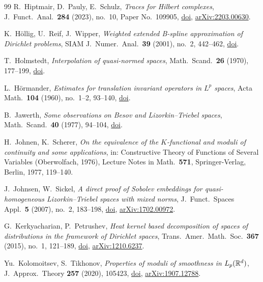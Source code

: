 \begin{thebibliography}{99}
R.~Hiptmair, D.~Pauly, E.~Schulz,
\emph{Traces for Hilbert complexes},
J.\ Funct.\ Anal.\ \textbf{284} (2023), no.~10, Paper No.~109905,
\href{https://doi.org/10.1016/j.jfa.2023.109905}{doi},
\href{https://arxiv.org/abs/2203.00630}{arXiv:2203.00630}.

K.~H\"ollig, U.~Reif, J.~Wipper,
\emph{Weighted extended B-spline approximation of Dirichlet problems},
SIAM J.\ Numer.\ Anal.\ \textbf{39} (2001), no.~2, 442--462,
\href{https://doi.org/10.1137/S0036142900373208}{doi}.

T.~Holmstedt,
\emph{Interpolation of quasi-normed spaces},
Math.\ Scand.\ \textbf{26} (1970), 177--199,
\href{https://doi.org/10.7146/math.scand.a-10976}{doi}.

L.~H\"ormander,
\emph{Estimates for translation invariant operators in $L^p$ spaces},
Acta Math.\ \textbf{104} (1960), no.~1--2, 93--140,
\href{https://doi.org/10.1007/BF02547187}{doi}.

B.~Jawerth,
\emph{Some observations on Besov and Lizorkin--Triebel spaces},
Math.\ Scand.\ \textbf{40} (1977), 94--104,
\href{https://doi.org/10.7146/math.scand.a-11678}{doi}.

H.~Johnen, K.~Scherer,
\emph{On the equivalence of the $K$-functional and moduli of continuity and some applications},
in: Constructive Theory of Functions of Several Variables (Oberwolfach, 1976), Lecture Notes in
Math.\ \textbf{571}, Springer-Verlag, Berlin, 1977, 119--140.

J.~Johnsen, W.~Sickel,
\emph{A direct proof of Sobolev embeddings for quasi-homogeneous Lizorkin--Triebel spaces with
mixed norms},
J.\ Funct.\ Spaces Appl.\ \textbf{5} (2007), no.~2, 183--198,
\href{https://doi.org/10.1155/2007/714905}{doi},
\href{https://arxiv.org/abs/1702.00972}{arXiv:1702.00972}.

G.~Kerkyacharian, P.~Petrushev,
\emph{Heat kernel based decomposition of spaces of distributions in the framework of Dirichlet
spaces},
Trans.\ Amer.\ Math.\ Soc.\ \textbf{367} (2015), no.~1, 121--189,
\href{https://doi.org/10.1090/S0002-9947-2014-05993-X}{doi},
\href{https://arxiv.org/abs/1210.6237}{arXiv:1210.6237}.

Yu.~Kolomoitsev, S.~Tikhonov,
\emph{Properties of moduli of smoothness in $L_p(\mathbb{R}^d)$},
J.\ Approx.\ Theory \textbf{257} (2020), 105423,
\href{https://doi.org/10.1016/j.jat.2020.105423}{doi},
\href{https://arxiv.org/abs/1907.12788}{arXiv:1907.12788}.


\end{thebibliography}
